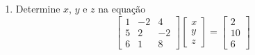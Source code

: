 \documentclass[a4paper, 12pt]{article}
\begin{document}
\begin{enumerate}
   \item Determine $x$, $y$ e $z$ na equação 
   $$
    \begin{bmatrix}
        1 & -2 & 4 \\ 
        5 & 2 & -2 \\
        6 & 1 & 8 
    \end{bmatrix}
    \begin{bmatrix}
        x \\ 
        y \\
        z 
    \end{bmatrix}
    =
    \begin{bmatrix}
        2 \\ 
        10 \\
        6 
    \end{bmatrix} 
   $$
   
    
\end{enumerate}
\end{document}
